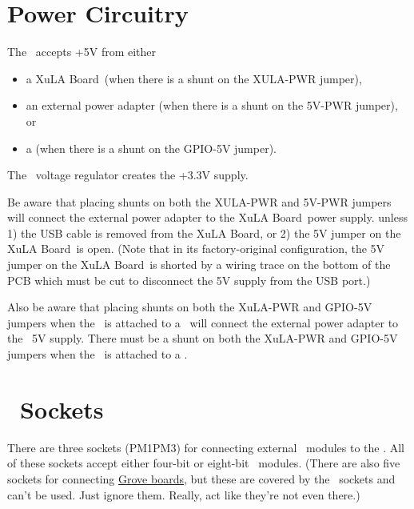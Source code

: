 \documentclass[letterpaper,11pt,oneside]{memoir}
\newcommand{\xula}{XuLA Board}
\renewcommand{\fixedpic}[1]{}
\begin{document}
\section{Power Circuitry}

The \product\ accepts +5V from either
\begin{itemize} 
\item a \xula\ (when there is a shunt on the XULA-PWR jumper),
\item an external power adapter (when there is a shunt on the 5V-PWR jumper), or
\item a \rpi (when there is a shunt on the GPIO-5V jumper).
\end{itemize}

The \product\ voltage regulator creates the +3.3V supply.

\fixedpic{\texttt{[image: pwr\_circuit.png]}}

Be aware that placing shunts on both the XULA-PWR and 5V-PWR jumpers will
connect the external power adapter to the \xula\ power supply. 
 unless 1) the USB cable is removed from the \xula,
or 2) the 5V jumper on the \xula\ is open.
(Note that in its factory-original
configuration, the 5V jumper on the \xula\ is shorted by a wiring trace on
the bottom of the PCB which must be cut to disconnect the 5V supply from the
USB port.)

Also be aware that placing shunts on both the XuLA-PWR and GPIO-5V jumpers
when the \product\ is attached to a \rpi\
will connect the external power adapter to the \rpi\ 5V supply.
There must  be a shunt on both the XuLA-PWR and GPIO-5V jumpers 
when the \product\ is attached to a \rpi.


\pagebreak %

\section{\digpmod\ Sockets}

There are three sockets (PM1\textendash PM3) for connecting external \digpmod\ modules 
to the \product.
All of these sockets accept either four-bit or eight-bit \digpmod\ modules.
(There are also five sockets for connecting 
\href{http://www.seeedstudio.com/wiki/Category:Grove}{Grove boards},
but these are covered by the \digpmod\ sockets and can't be used. 
Just ignore them. 
Really, act like they're not even there.)
\end{document}
